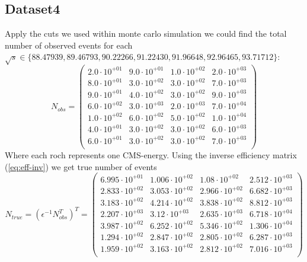 \documentclass[]{article}
\begin{document}
\subsection{Dataset4}
Apply the cuts we used within monte carlo simulation we could find the total number of observed events for each $\sqrt{s} \in \{88.47939, 89.46793, 90.22266, 91.22430, 91.96648, 92.96465, 93.71712\}$:
\begin{equation}
N_{obs}=\begin{pmatrix}
   2.0\cdot 10^{+01} & 9.0\cdot 10^{+01} & 1.0\cdot 10^{+02} & 2.0\cdot 10^{+03} \\
   8.0\cdot 10^{+01} & 3.0\cdot 10^{+02} & 3.0\cdot 10^{+02} & 7.0\cdot 10^{+03} \\
   9.0\cdot 10^{+01} & 4.0\cdot 10^{+02} & 3.0\cdot 10^{+02} & 9.0\cdot 10^{+03} \\
   6.0\cdot 10^{+02} & 3.0\cdot 10^{+03} & 2.0\cdot 10^{+03} & 7.0\cdot 10^{+04} \\
   1.0\cdot 10^{+02} & 6.0\cdot 10^{+02} & 5.0\cdot 10^{+02} & 1.0\cdot 10^{+04} \\
   4.0\cdot 10^{+01} & 3.0\cdot 10^{+02} & 3.0\cdot 10^{+02} & 6.0\cdot 10^{+03} \\
   6.0\cdot 10^{+01} & 3.0\cdot 10^{+02} & 3.0\cdot 10^{+02} & 7.0\cdot 10^{+03} \\
\end{pmatrix}
\end{equation}
Where each roch represents one CMS-energy.
Using the inverse efficiency matrix (\ref{eq:eff-inv}) we get true number of events
\begin{equation}
N_{true} = (\epsilon^{-1}N_{obs}^T)^T = \begin{pmatrix}
   6.995\cdot 10^{+01} & 1.006\cdot 10^{+02} & 1.08\cdot 10^{+02} & 2.512\cdot 10^{+03} \\
   2.833\cdot 10^{+02} & 3.053\cdot 10^{+02} & 2.966\cdot 10^{+02} & 6.682\cdot 10^{+03} \\
   3.183\cdot 10^{+02} & 4.214\cdot 10^{+02} & 3.838\cdot 10^{+02} & 8.812\cdot 10^{+03} \\
   2.207\cdot 10^{+03} & 3.12\cdot 10^{+03} & 2.635\cdot 10^{+03} & 6.718\cdot 10^{+04} \\
   3.987\cdot 10^{+02} & 6.252\cdot 10^{+02} & 5.346\cdot 10^{+02} & 1.306\cdot 10^{+04} \\
   1.294\cdot 10^{+02} & 2.847\cdot 10^{+02} & 2.805\cdot 10^{+02} & 6.287\cdot 10^{+03} \\
   1.959\cdot 10^{+02} & 3.163\cdot 10^{+02} & 2.812\cdot 10^{+02} & 7.016\cdot 10^{+03} \\
\end{pmatrix}
\end{equation}
\end{document}
